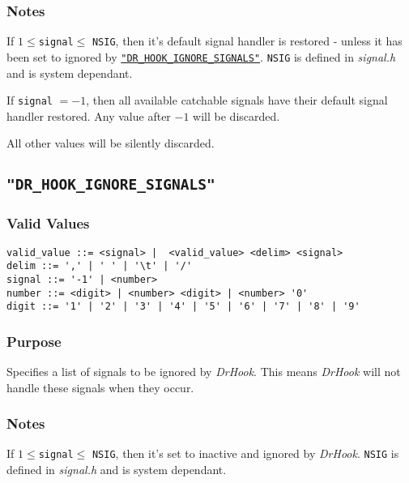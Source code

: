 \vspace{-2ex}
\subsubsection{Notes}
\vspace{-2ex}
If $1 \leq $\verb|signal|$ \leq$ \verb+NSIG+, then it's default signal handler is restored - unless it has been set to ignored by 
\hyperref[section:flags:DR_HOOK_IGNORE_SIGNALS]{\texttt{"DR\_HOOK\_IGNORE\_SIGNALS"}}. \verb|NSIG| is defined in \textit{signal.h} and is system dependant.

If \verb|signal| $= -1$, then all available catchable signals have their default signal handler restored. Any value after $-1$ will be discarded.

All other values will be silently discarded.



\subsection{\texttt{"DR\_HOOK\_IGNORE\_SIGNALS"}}
\label{section:flags:DR_HOOK_IGNORE_SIGNALS}
\vspace{-2ex}
\subsubsection{Valid Values}
\vspace{-2ex}
\verb+valid_value ::= <signal> |  <valid_value> <delim> <signal>+ \\
\verb+delim ::= ',' | ' ' | '\t' | '/'+ \\
\verb+signal ::= '-1' | <number>+\\
\verb+number ::= <digit> | <number> <digit> | <number> '0'+ \\
\verb+digit ::= '1' | '2' | '3' | '4' | '5' | '6' | '7' | '8' | '9'+

\vspace{-2ex}
\subsubsection{Purpose}
\vspace{-2ex}
Specifies a list of signals to be ignored by \textit{DrHook}. This means \textit{DrHook} will not handle these signals when they occur.

\vspace{-2ex}
\subsubsection{Notes}
\vspace{-2ex}
If $1 \leq $\verb|signal|$ \leq$ \verb+NSIG+, then it's set to inactive and ignored by \textit{DrHook}. \verb|NSIG| is defined in \textit{signal.h} and is system dependant.

